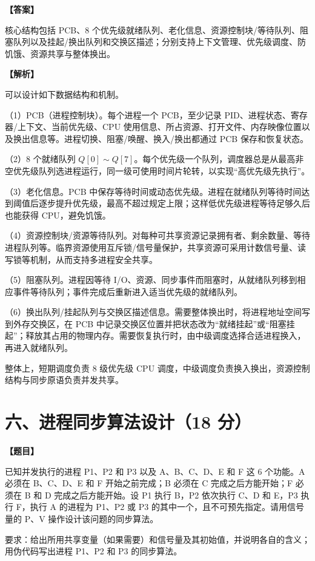 \documentclass[UTF8,12pt]{ctexart}
\newenvironment{question}{\par\medskip\noindent\textbf{【题目】}\par\smallskip}{\par\medskip}
\newenvironment{explanation}{\par\noindent\textbf{【解析】}\par\smallskip}{\par\medskip}
\newenvironment{answer}{\par\noindent\textbf{【答案】}\par\smallskip}{\par}
\begin{document}
\begin{answer}
核心结构包括 PCB、8 个优先级就绪队列、老化信息、资源控制块/等待队列、阻塞队列以及挂起/换出队列和交换区描述；分别支持上下文管理、优先级调度、防饥饿、资源共享与整体换出。
\end{answer}

\begin{explanation}
可以设计如下数据结构和机制。

（1）PCB（进程控制块）。每个进程一个 PCB，至少记录 PID、进程状态、寄存器/上下文、当前优先级、CPU 使用信息、所占资源、打开文件、内存映像位置以及换出信息等。进程切换、阻塞/唤醒、换入/换出都通过 PCB 保存和恢复状态。

（2）8 个就绪队列 $Q[0]\sim Q[7]$。每个优先级一个队列，调度器总是从最高非空优先级队列选进程运行，同一级可使用时间片轮转，以实现“高优先级先执行”。

（3）老化信息。PCB 中保存等待时间或动态优先级。进程在就绪队列等待时间达到阈值后逐步提升优先级，最高不超过规定上限；这样低优先级进程等待足够久后也能获得 CPU，避免饥饿。

（4）资源控制块/资源等待队列。对每种可共享资源记录拥有者、剩余数量、等待进程队列等。临界资源使用互斥锁/信号量保护，共享资源可采用计数信号量、读写锁等机制，从而支持多进程安全共享。

（5）阻塞队列。进程因等待 I/O、资源、同步事件而阻塞时，从就绪队列移到相应事件等待队列；事件完成后重新进入适当优先级的就绪队列。

（6）换出队列/挂起队列与交换区描述信息。需要整体换出时，将进程地址空间写到外存交换区，在 PCB 中记录交换区位置并把状态改为“就绪挂起”或“阻塞挂起”；释放其占用的物理内存。需要恢复执行时，由中级调度选择合适进程换入，再进入就绪队列。

整体上，短期调度负责 8 级优先级 CPU 调度，中级调度负责换入换出，资源控制结构与同步原语负责并发共享。
\end{explanation}
\section*{六、进程同步算法设计（18 分）}
\begin{question}
已知并发执行的进程 P1、P2 和 P3 以及 A、B、C、D、E 和 F 这 6 个功能。A 必须在 B、C、D、E 和 F 开始之前完成；B 必须在 C 完成之后方能开始；F 必须在 B 和 D 完成之后方能开始。设 P1 执行 B，P2 依次执行 C、D 和 E，P3 执行 F，执行 A 的进程为 P1、P2 或 P3 的其中一个，且不可预先指定。请用信号量的 P、V 操作设计该问题的同步算法。

要求：给出所用共享变量（如果需要）和信号量及其初始值，并说明各自的含义；用伪代码写出进程 P1、P2 和 P3 的同步算法。
\end{question}
\end{document}
